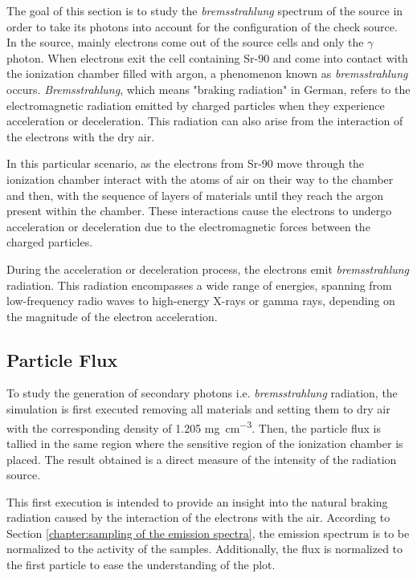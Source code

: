 The goal of this section is to study the \textit{bremsstrahlung} spectrum of the source in order to take its photons into account for the configuration of the check source.
In the source, mainly electrons come out of the source cells and only the $\gamma$ photon. When electrons exit the cell containing Sr-90 and come into contact with the ionization chamber filled with argon, a phenomenon known as \emph{bremsstrahlung} occurs. \emph{Bremsstrahlung}, which means "braking radiation" in German, refers to the electromagnetic radiation emitted by charged particles when they experience acceleration or deceleration. This radiation can also arise from the interaction of the electrons with the dry air.

In this particular scenario, as the electrons from Sr-90 move through the ionization chamber interact with the atoms of air on their way to the chamber and then, with the sequence of layers of materials until they reach the argon present within the chamber. These interactions cause the electrons to undergo acceleration or deceleration due to the electromagnetic forces between the charged particles.

During the acceleration or deceleration process, the electrons emit \emph{bremsstrahlung} radiation. This radiation encompasses a wide range of energies, spanning from low-frequency radio waves to high-energy X-rays or gamma rays, depending on the magnitude of the electron acceleration.

\subsection{Particle Flux}

To study the generation of secondary photons i.e. \emph{bremsstrahlung} radiation, the simulation is first executed removing all materials and setting them to dry air with the corresponding density of 1.205 \unit{\milli\gram\per\cubic\centi\meter}. Then, the particle flux is tallied in the same region where the sensitive region of the ionization chamber is placed. The result obtained is a direct measure of the intensity of the radiation source. 

This first execution is intended to provide an insight into the natural braking radiation caused by the interaction of the electrons with the air. According to Section \ref{chapter:sampling of the emission spectra}, the emission spectrum is to be normalized to the activity of the samples. Additionally, the flux is normalized to the first particle to ease the understanding of the plot. 

